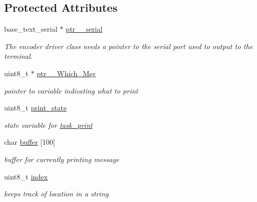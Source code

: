 \subsection*{Protected Attributes}
\begin{DoxyCompactItemize}
\item 
\hypertarget{classtask__print_a275823ba4262e853d1d0e23ddc47d072}{base\-\_\-text\-\_\-serial $\ast$ \hyperlink{classtask__print_a275823ba4262e853d1d0e23ddc47d072}{ptr\-\_\-\_\-serial}}\label{classtask__print_a275823ba4262e853d1d0e23ddc47d072}

\begin{DoxyCompactList}\small\item\em The encoder driver class needs a pointer to the serial port used to output to the terminal. \end{DoxyCompactList}\item 
\hypertarget{classtask__print_a91f7b1c68dec0129316c3fe2571aa97c}{uint8\-\_\-t $\ast$ \hyperlink{classtask__print_a91f7b1c68dec0129316c3fe2571aa97c}{ptr\-\_\-\_\-\-Which\-\_\-\-Msg}}\label{classtask__print_a91f7b1c68dec0129316c3fe2571aa97c}

\begin{DoxyCompactList}\small\item\em pointer to variable indicating what to print \end{DoxyCompactList}\item 
\hypertarget{classtask__print_a87b9dda7012470c179153de23e9cc924}{uint8\-\_\-t \hyperlink{classtask__print_a87b9dda7012470c179153de23e9cc924}{print\-\_\-state}}\label{classtask__print_a87b9dda7012470c179153de23e9cc924}

\begin{DoxyCompactList}\small\item\em state variable for \hyperlink{classtask__print}{task\-\_\-print} \end{DoxyCompactList}\item 
\hypertarget{classtask__print_a94acdd3205ef9ea2ff5f2030bfd8e725}{char \hyperlink{classtask__print_a94acdd3205ef9ea2ff5f2030bfd8e725}{buffer} \mbox{[}100\mbox{]}}\label{classtask__print_a94acdd3205ef9ea2ff5f2030bfd8e725}

\begin{DoxyCompactList}\small\item\em buffer for currently printing message \end{DoxyCompactList}\item 
\hypertarget{classtask__print_a86c6f9278fe864a462ff8e6bea1f176c}{uint8\-\_\-t \hyperlink{classtask__print_a86c6f9278fe864a462ff8e6bea1f176c}{index}}\label{classtask__print_a86c6f9278fe864a462ff8e6bea1f176c}

\begin{DoxyCompactList}\small\item\em keeps track of location in a string \end{DoxyCompactList}\end{DoxyCompactItemize}


